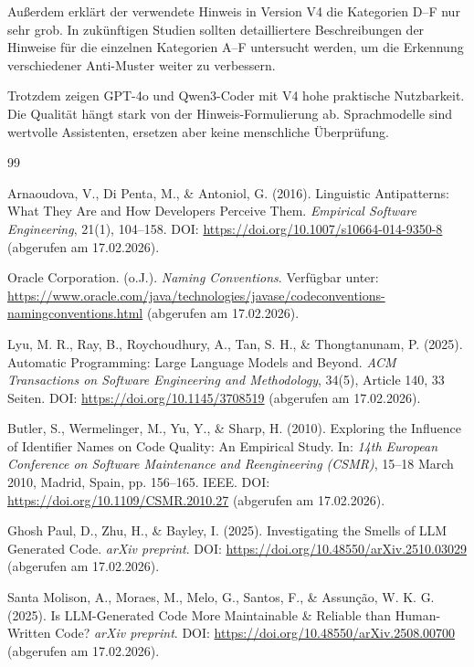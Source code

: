 \documentclass[a4paper,12pt]{article}
\begin{document}
Außerdem erklärt der verwendete Hinweis in Version V4 die Kategorien D–F nur sehr grob. In zukünftigen Studien sollten detailliertere Beschreibungen der Hinweise für die einzelnen Kategorien A–F untersucht werden, um die Erkennung verschiedener Anti-Muster weiter zu verbessern.

Trotzdem zeigen GPT-4o und Qwen3-Coder mit V4 hohe praktische Nutzbarkeit. Die Qualität hängt stark von der Hinweis-Formulierung ab. Sprachmodelle sind wertvolle Assistenten, ersetzen aber keine menschliche Überprüfung.


\clearpage
\begin{thebibliography}{99}

    Arnaoudova, V., Di Penta, M., \& Antoniol, G. (2016).
    Linguistic Antipatterns: What They Are and How Developers Perceive Them.
    \textit{Empirical Software Engineering}, 21(1), 104–158.
    DOI: \url{https://doi.org/10.1007/s10664-014-9350-8}
    (abgerufen am 17.02.2026).

    Oracle Corporation. (o.J.).
    \textit{Naming Conventions}.
    Verfügbar unter:
    \url{https://www.oracle.com/java/technologies/javase/codeconventions-namingconventions.html}
    (abgerufen am 17.02.2026).

    Lyu, M. R., Ray, B., Roychoudhury, A., Tan, S. H., \& Thongtanunam, P. (2025).
    Automatic Programming: Large Language Models and Beyond.
    \textit{ACM Transactions on Software Engineering and Methodology}, 34(5), Article 140, 33 Seiten.
    DOI: \url{https://doi.org/10.1145/3708519}
    (abgerufen am 17.02.2026).

    Butler, S., Wermelinger, M., Yu, Y., \& Sharp, H. (2010).
    Exploring the Influence of Identifier Names on Code Quality: An Empirical Study.
    In: \textit{14th European Conference on Software Maintenance and Reengineering (CSMR)},
    15–18 March 2010, Madrid, Spain, pp. 156–165.
    IEEE.
    DOI: \url{https://doi.org/10.1109/CSMR.2010.27}
    (abgerufen am 17.02.2026).

    Ghosh Paul, D., Zhu, H., \& Bayley, I. (2025).
    Investigating the Smells of LLM Generated Code.
    \textit{arXiv preprint}.
    DOI: \url{https://doi.org/10.48550/arXiv.2510.03029}
    (abgerufen am 17.02.2026).

    Santa Molison, A., Moraes, M., Melo, G., Santos, F., \& Assunção, W. K. G. (2025).
    Is LLM-Generated Code More Maintainable \& Reliable than Human-Written Code?
    \textit{arXiv preprint}.
    DOI: \url{https://doi.org/10.48550/arXiv.2508.00700}
    (abgerufen am 17.02.2026).


\end{thebibliography}
\end{document}
